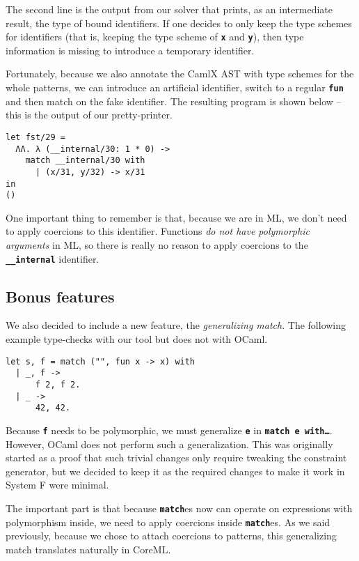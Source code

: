 \documentclass[10pt,a4paper,twoside,titlepage,twocolumn]{article}
\newcommand{\code}[1]{\textbf{\texttt{#1}}}
\begin{document}
The second line is the output from our solver that prints, as an intermediate
result, the type of bound identifiers. If one decides to only keep the type
schemes for identifiers (that is, keeping the type scheme of \code{x} and
\code{y}), then type information is missing to introduce a temporary identifier.

Fortunately, because we also annotate the CamlX AST with type schemes
for the whole patterns, we can introduce an artificial identifier, switch to a
regular \code{fun} and then match on the fake identifier. The resulting program
is shown below -- this is the output of our pretty-printer.

\begin{verbatim}
let fst/29 =
  ΛΛ. λ (__internal/30: 1 * 0) -> 
    match __internal/30 with
      | (x/31, y/32) -> x/31
in
()
\end{verbatim}

One important thing to remember is that, because we are in ML, we don't need to
apply coercions to this identifier. Functions \emph{do not have polymorphic
arguments} in ML, so there is really no reason to apply coercions to the
\code{\_\_internal} identifier.

\subsection{Bonus features}

We also decided to include a new feature, the \emph{generalizing match}. The
following example type-checks with our tool but does not with OCaml.

\begin{verbatim}
let s, f = match ("", fun x -> x) with
  | _, f ->
      f 2, f 2.
  | _ ->
      42, 42.
\end{verbatim}

Because \code{f} needs to be polymorphic, we must generalize \code{e} in
\code{match e with\dots}. However, OCaml does not perform such a generalization.
This was originally started as a proof that such trivial changes only require
tweaking the constraint generator, but we decided to keep it as the required
changes to make it work in System F were minimal.

The important part is that because \code{match}es now can operate on
expressions with polymorphism inside, we need to apply coercions inside
\code{match}es. As we said previously, because we chose to attach coercions to
patterns, this generalizing match translates naturally in CoreML.
\end{document}

